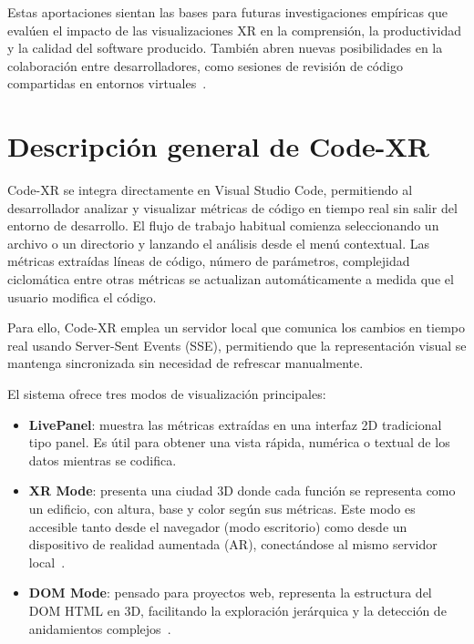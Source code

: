 \documentclass[a4paper, 12pt]{book}
\begin{document}
Estas aportaciones sientan las bases para futuras investigaciones empíricas que evalúen el impacto de las visualizaciones XR en la comprensión, la productividad y la calidad del software producido. También abren nuevas posibilidades en la colaboración entre desarrolladores, como sesiones de revisión de código compartidas en entornos virtuales~\cite{fittkau2015exploring}.

\section{Descripción general de Code-XR}
\label{sec:descripcion-general}


Code-XR se integra directamente en Visual Studio Code, permitiendo al desarrollador analizar y visualizar métricas de código en tiempo real sin salir del entorno de desarrollo. El flujo de trabajo habitual comienza seleccionando un archivo o un directorio y lanzando el análisis desde el menú contextual. Las métricas extraídas líneas de código, número de parámetros, complejidad ciclomática entre otras métricas se actualizan automáticamente a medida que el usuario modifica el código.

Para ello, Code-XR emplea un servidor local que comunica los cambios en tiempo real usando Server-Sent Events (SSE), permitiendo que la representación visual se mantenga sincronizada sin necesidad de refrescar manualmente.

El sistema ofrece tres modos de visualización principales:

\begin{itemize}
    \item \textbf{LivePanel}: muestra las métricas extraídas en una interfaz 2D tradicional tipo panel. Es útil para obtener una vista rápida, numérica o textual de los datos mientras se codifica.
    \item \textbf{XR Mode}: presenta una ciudad 3D donde cada función se representa como un edificio, con altura, base y color según sus métricas. Este modo es accesible tanto desde el navegador (modo escritorio) como desde un dispositivo de realidad aumentada (AR), conectándose al mismo servidor local~\cite{wettel2007visualizing, fittkau2015exploring}.
    \item \textbf{DOM Mode}: pensado para proyectos web, representa la estructura del DOM HTML en 3D, facilitando la exploración jerárquica y la detección de anidamientos complejos~\cite{moreno2024enhancing}.
\end{itemize}
\end{document}
